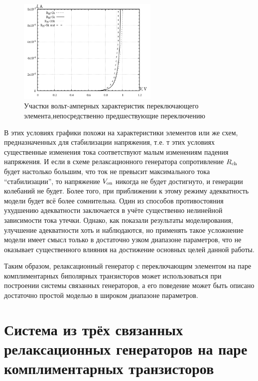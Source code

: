 \begin{figure}[htb!]
  \centerline{\includegraphics[width=0.6\textwidth]{p/relax3d_sw_va_mini.png} }
  \caption{Участки вольт-амперных характеристик переключающего элемента,непосредственно предшествующие переключению}
  \label{atu:f:relax3d_sw_vah_mini}
\end{figure}

В этих условиях графики похожи на характеристики элементов или же схем,
предназначенных для стабилизации напряжения, т.е. т этих условиях
существенные изменения тока соответствуют малым изменениям падения напряжения.
И если в схеме релаксационного генератора сопротивление $R_\mathrm{ch}$ будет настолько
большим, что ток не превысит максимального тока ``стабилизации'',
то напряжение $V_\mathrm{on}$ никогда не будет достигнуто,
и генерации колебаний не будет.
Более того, при приближении к этому режиму
адекватность модели будет всё более сомнительна.
Один из способов противостояния ухудшению адекватности
заключается в учёте существенно нелинейной зависимости тока утечки.
Однако, как показали результаты моделирования,
улучшение адекватности хоть и наблюдаются,
но применять такое усложнение модели имеет смысл только в достаточно
узком диапазоне параметров, что не оказывает существенного влияния на
достижение основных целей данной работы.

Таким образом, релаксационный генератор с переключающим
элементом на паре комплиментарных биполярных транзисторов
может использоваться при построении системы связанных генераторов,
а его поведение может быть описано достаточно простой моделью
в широком диапазоне параметров.



\section{Система из трёх связанных релаксационных генераторов на паре комплиментарных транзисторов}
\label{atu:sec:relax3d}


